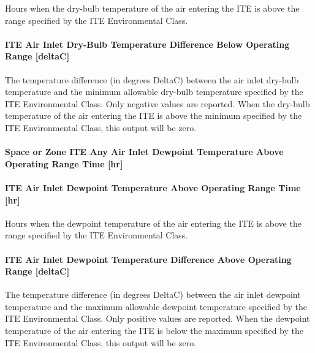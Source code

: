 Hours when the dry-bulb temperature of the air entering the ITE is above the range specified by the ITE Environmental Class.

\paragraph{ITE Air Inlet Dry-Bulb Temperature Difference Below Operating Range {[}deltaC{]}}\label{ite-air-inlet-dry-bulb-temperature-difference-below-operating-range-deltac}

The temperature difference (in degrees DeltaC) between the air inlet dry-bulb temperature and the minimum allowable dry-bulb temperature specified by the ITE Environmental Class. Only negative values are reported. When the dry-bulb temperature of the air entering the ITE is above the minimum specified by the ITE Environmental Class, this output will be zero.

\paragraph{Space or Zone ITE Any Air Inlet Dewpoint Temperature Above Operating Range Time {[}hr{]}}\label{zone-ite-any-air-inlet-dewpoint-temperature-above-operating-range-time-hr}

\paragraph{ITE Air Inlet Dewpoint Temperature Above Operating Range Time {[}hr{]}}\label{ite-air-inlet-dewpoint-temperature-above-operating-range-time-hr}

Hours when the dewpoint temperature of the air entering the ITE is above the range specified by the ITE Environmental Class.

\paragraph{ITE Air Inlet Dewpoint Temperature Difference Above Operating Range {[}deltaC{]}}\label{ite-air-inlet-dewpoint-temperature-difference-above-operating-range-deltac}

The temperature difference (in degrees DeltaC) between the air inlet dewpoint temperature and the maximum allowable dewpoint temperature specified by the ITE Environmental Class. Only positive values are reported. When the dewpoint temperature of the air entering the ITE is below the maximum specified by the ITE Environmental Class, this output will be zero.


